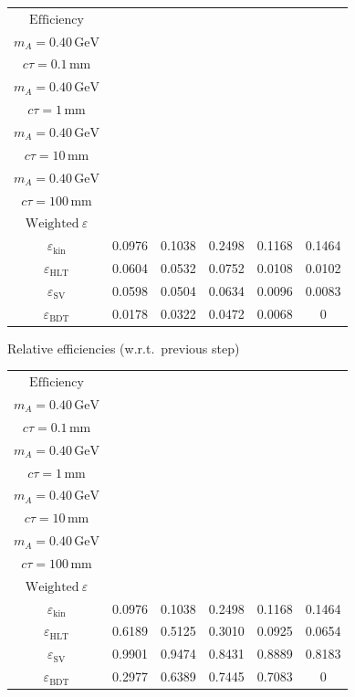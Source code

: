 \documentclass[10pt,a4paper]{article}
\begin{document}
{\begin{tabular}{cccccc}
\toprule
$\mathrm{Efficiency}$ & \shortstack{$m_{\pi}=4\,\mathrm{GeV}$\\$m_{A}=0.40\,\mathrm{GeV}$\\$c\tau=0.1\,\mathrm{mm}$} & \shortstack{$m_{\pi}=4\,\mathrm{GeV}$\\$m_{A}=0.40\,\mathrm{GeV}$\\$c\tau=1\,\mathrm{mm}$} & \shortstack{$m_{\pi}=4\,\mathrm{GeV}$\\$m_{A}=0.40\,\mathrm{GeV}$\\$c\tau=10\,\mathrm{mm}$} & \shortstack{$m_{\pi}=4\,\mathrm{GeV}$\\$m_{A}=0.40\,\mathrm{GeV}$\\$c\tau=100\,\mathrm{mm}$} & \shortstack{$\mathrm{QCD}$\\$\mathrm{Weighted}\ \varepsilon$} \\
\midrule
$\varepsilon_{\mathrm{kin}}$ & 0.0976 & 0.1038 & 0.2498 & 0.1168 & 0.1464\\
$\varepsilon_{\mathrm{HLT}}$ & 0.0604 & 0.0532 & 0.0752 & 0.0108 & 0.0102\\
$\varepsilon_{\mathrm{SV}}$ & 0.0598 & 0.0504 & 0.0634 & 0.0096 & 0.0083\\
$\varepsilon_{\mathrm{BDT}}$ & 0.0178 & 0.0322 & 0.0472 & 0.0068 & $0$\\
\bottomrule
\end{tabular}

\vspace{18pt}

Relative efficiencies (w.r.t.\ previous step)

\begin{tabular}{cccccc}
\toprule
$\mathrm{Efficiency}$ & \shortstack{$m_{\pi}=4\,\mathrm{GeV}$\\$m_{A}=0.40\,\mathrm{GeV}$\\$c\tau=0.1\,\mathrm{mm}$} & \shortstack{$m_{\pi}=4\,\mathrm{GeV}$\\$m_{A}=0.40\,\mathrm{GeV}$\\$c\tau=1\,\mathrm{mm}$} & \shortstack{$m_{\pi}=4\,\mathrm{GeV}$\\$m_{A}=0.40\,\mathrm{GeV}$\\$c\tau=10\,\mathrm{mm}$} & \shortstack{$m_{\pi}=4\,\mathrm{GeV}$\\$m_{A}=0.40\,\mathrm{GeV}$\\$c\tau=100\,\mathrm{mm}$} & \shortstack{$\mathrm{QCD}$\\$\mathrm{Weighted}\ \varepsilon$} \\
\midrule
$\varepsilon_{\mathrm{kin}}$ & 0.0976 & 0.1038 & 0.2498 & 0.1168 & 0.1464\\
$\varepsilon_{\mathrm{HLT}}$ & 0.6189 & 0.5125 & 0.3010 & 0.0925 & 0.0654\\
$\varepsilon_{\mathrm{SV}}$ & 0.9901 & 0.9474 & 0.8431 & 0.8889 & 0.8183\\
$\varepsilon_{\mathrm{BDT}}$ & 0.2977 & 0.6389 & 0.7445 & 0.7083 & $0$\\
\bottomrule
\end{tabular}

}
\end{document}

